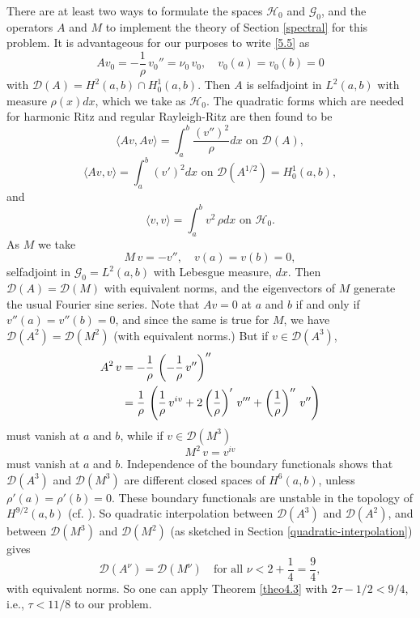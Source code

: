 \documentclass[final]{siamltex}
\numberwithin{equation}{section}
\begin{document}
There are at least two ways to formulate the spaces $\mathcal{H}_0$ and $\mathcal{G}_0$, and the operators $A$ and $M$ to implement the theory of Section \ref{spectral} for this problem. It is advantageous for our purposes to write \eqref{5.5} as
\begin{equation} \label{5.11}
A v_0 = -\frac{1}{\rho} \, v_0'' = \nu_0 \, v_0, \quad v_0(a)=v_0(b)=0
\end{equation}
with $\mathcal{D}(A) = H^2(a,b) \cap H_0^1(a,b)$. Then $A$ is selfadjoint in $L^2(a,b)$ with measure $\rho(x) dx$, which we take as $\mathcal{H}_0$. The quadratic forms which are needed for harmonic Ritz and regular Rayleigh-Ritz are then found to be
\[\langle A v, A v\rangle =\displaystyle{ \int_a^b \frac{\left(v''\right)^2}{\rho} dx} \text{ on } \mathcal{D}(A),\]
\[\langle A v, v\rangle =\displaystyle{ \int_a^b \left(v'\right)^2 dx} \text{ on } \mathcal{D}(A^{1/2})=H_0^1(a,b),\]
and
\[\langle v, v\rangle =\displaystyle{ \int_a^b v^2 \, \rho dx} \text{ on } \mathcal{H}_0.\]
As $M$ we take
\begin{equation} \label{5.12}
M \, v = - v'', \quad v(a) =v(b)=0,
\end{equation}
selfadjoint in $\mathcal{G}_0=L^2(a,b)$ with Lebesgue measure, $dx$. Then $\mathcal{D}(A)=\mathcal{D}(M)$ with equivalent norms, and the eigenvectors of $M$ generate the usual Fourier sine series. Note that $A v=0$ at $a$ and $b$ if and only if $v''(a) = v''(b)=0$, and since the same is true for $M$, we have $\mathcal{D}(A^2)=\mathcal{D}(M^2)$ (with equivalent norms.) But if $v\in\mathcal{D}(A^3)$,
\begin{align} \label{new5.3}
A^2 \, v &= -\frac{1}{\rho} \, \left( -\frac{1}{\rho} \, v''\right)''\notag \\
&=\frac{1}{\rho} \, \left(\frac{1}{\rho} \, v^{iv} + 2 \left(\frac{1}{\rho}\right)' \, v''' + \left(\frac{1}{\rho}\right)'' \, v'' \right)
\end{align}
must vanish at $a$ and $b$, while if $v \in \mathcal{D}(M^3)$
\[M^2 \, v = v^{iv}\]
must vanish at $a$ and $b$. Independence of the boundary functionals shows that $\mathcal{D}(A^3)$ and $\mathcal{D}(M^3)$ are different closed spaces of $H^6(a,b)$, unless $\rho'(a)=\rho'(b)=0$. These boundary functionals are unstable in the topology of $H^{9/2}(a,b)$ (cf. \cite{Grisvard}). So quadratic interpolation between $\mathcal{D}(A^3)$ and
$\mathcal{D}(A^2)$, and between $\mathcal{D}(M^3)$ and $\mathcal{D}(M^2)$
(as sketched in Section \ref{quadratic-interpolation}) gives
\[\mathcal{D}(A^{\nu}) = \mathcal{D}(M^{\nu}) \quad \text{for all } \nu <2+\frac{1}{4}= \frac{9}{4},\]
with equivalent norms. So one can apply Theorem \ref{theo4.3} with $2 \tau-1/2<9/4$, i.e., $\tau<11/8$ to our problem.
\end{document}
